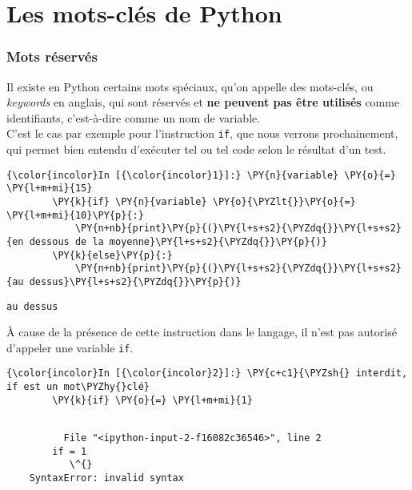     \hypertarget{les-mots-cluxe9s-de-python}{%
\section{Les mots-clés de Python}\label{les-mots-cluxe9s-de-python}}

    \hypertarget{mots-ruxe9servuxe9s}{%
\subsubsection{Mots réservés}\label{mots-ruxe9servuxe9s}}

    Il existe en Python certains mots spéciaux, qu'on appelle des mots-clés,
ou \emph{keywords} en anglais, qui sont réservés et \textbf{ne peuvent
pas être utilisés} comme identifiants, c'est-à-dire comme un nom de
variable.\\

    C'est le cas par exemple pour l'instruction \texttt{if}, que nous
verrons prochainement, qui permet bien entendu d'exécuter tel ou tel
code selon le résultat d'un test.

    \begin{Verbatim}[commandchars=\\\{\}]
{\color{incolor}In [{\color{incolor}1}]:} \PY{n}{variable} \PY{o}{=} \PY{l+m+mi}{15}
        \PY{k}{if} \PY{n}{variable} \PY{o}{\PYZlt{}}\PY{o}{=} \PY{l+m+mi}{10}\PY{p}{:}
            \PY{n+nb}{print}\PY{p}{(}\PY{l+s+s2}{\PYZdq{}}\PY{l+s+s2}{en dessous de la moyenne}\PY{l+s+s2}{\PYZdq{}}\PY{p}{)}
        \PY{k}{else}\PY{p}{:}
            \PY{n+nb}{print}\PY{p}{(}\PY{l+s+s2}{\PYZdq{}}\PY{l+s+s2}{au dessus}\PY{l+s+s2}{\PYZdq{}}\PY{p}{)}
\end{Verbatim}


    \begin{Verbatim}[commandchars=\\\{\}]
au dessus

    \end{Verbatim}

    À cause de la présence de cette instruction dans le langage, il n'est
pas autorisé d'appeler une variable \texttt{if}.

    \begin{Verbatim}[commandchars=\\\{\}]
{\color{incolor}In [{\color{incolor}2}]:} \PY{c+c1}{\PYZsh{} interdit, if est un mot\PYZhy{}clé}
        \PY{k}{if} \PY{o}{=} \PY{l+m+mi}{1}
\end{Verbatim}


    \begin{Verbatim}[commandchars=\\\{\}]

          File "<ipython-input-2-f16082c36546>", line 2
        if = 1
           \^{}
    SyntaxError: invalid syntax
    \end{Verbatim}

